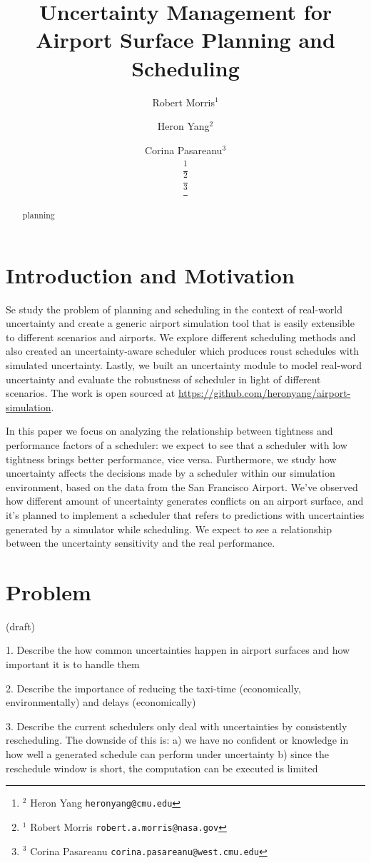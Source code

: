 \documentclass[letterpaper, 10 pt, conference]{ieeeconf}
\title{Uncertainty Management for Airport Surface Planning and Scheduling}
\author{Robert Morris$^{1}$ \and Heron Yang$^{2}$  \and Corina Pasareanu$^{3}$ \\ %
\thanks{$^{2}$ Heron Yang {\tt\small heronyang@cmu.edu}} \\
\thanks{$^{1}$ Robert Morris {\tt\small robert.a.morris@nasa.gov}} \\%
\thanks{$^{3}$ Corina Pasareanu {\tt\small corina.pasareanu@west.cmu.edu}}%
}
\begin{document}
\maketitle
\begin{abstract}planning
\end{abstract}
\section{Introduction and Motivation}

Se study the problem of planning and scheduling in the context of real-world uncertainty and create a generic airport simulation tool that is easily extensible to different scenarios and airports. We explore different scheduling methods and also created an uncertainty-aware scheduler which produces roust schedules with simulated uncertainty. Lastly, we built an uncertainty module to model real-word uncertainty and evaluate the robustness of scheduler in light of different scenarios. The work is open sourced at \url{https://github.com/heronyang/airport-simulation}.

In this paper we focus on analyzing the relationship between tightness and performance factors of a scheduler: we expect to see that a scheduler with low tightness brings better performance, vice versa. Furthermore, we study how uncertainty affects the decisions made by a scheduler within our simulation environment, based on the data from the San Francisco Airport. We've observed how different amount of uncertainty generates conflicts on an airport surface, and it's planned to implement a scheduler that refers to predictions with uncertainties generated by a simulator while scheduling. We expect to see a relationship between the uncertainty sensitivity and the real performance.

\section{Problem}

(draft)

1. Describe the how common uncertainties happen in airport surfaces and how important it is to handle them

2. Describe the importance of reducing the taxi-time (economically, environmentally) and delays (economically)

3. Describe the current schedulers only deal with uncertainties by consistently rescheduling. The downside of this is: a) we have no confident or knowledge in how well a generated schedule can perform under uncertainty b) since the reschedule window is short, the computation can be executed is limited
\end{document}
